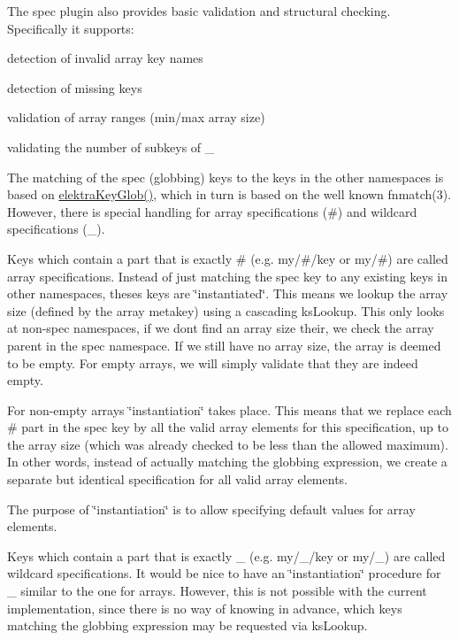 The spec plugin also provides basic validation and structural checking. Specifically it supports\+:


\begin{DoxyItemize}
\item detection of invalid array key names
\item detection of missing keys
\item validation of array ranges (min/max array size)
\item validating the number of subkeys of {\ttfamily \+\_\+}
\end{DoxyItemize}

The matching of the spec (globbing) keys to the keys in the other namespaces is based on {\ttfamily \mbox{\hyperlink{globbing_8c_ad7700821df72fc0fc3bfc336e4368d29}{elektra\+Key\+Glob()}}}, which in turn is based on the well known {\ttfamily fnmatch(3)}. However, there is special handling for array specifications ({\ttfamily \#}) and wildcard specifications ({\ttfamily \+\_\+}).

Keys which contain a part that is exactly {\ttfamily \#} (e.\+g. {\ttfamily my/\#/key} or {\ttfamily my/\#}) are called array specifications. Instead of just matching the spec key to any existing keys in other namespaces, theses keys are \char`\"{}instantiated\char`\"{}. This means we lookup the array size (defined by the {\ttfamily array} metakey) using a cascading {\ttfamily ks\+Lookup}. This only looks at non-\/spec namespaces, if we don\textquotesingle{}t find an array size their, we check the array parent in the spec namespace. If we still have no array size, the array is deemed to be empty. For empty arrays, we will simply validate that they are indeed empty.

For non-\/empty arrays \char`\"{}instantiation\char`\"{} takes place. This means that we replace each {\ttfamily \#} part in the spec key by all the valid array elements for this specification, up to the array size (which was already checked to be less than the allowed maximum). In other words, instead of actually matching the globbing expression, we create a separate but identical specification for all valid array elements.

The purpose of \char`\"{}instantiation\char`\"{} is to allow specifying {\ttfamily default} values for array elements.

Keys which contain a part that is exactly {\ttfamily \+\_\+} (e.\+g. {\ttfamily my/\+\_\+/key} or {\ttfamily my/\+\_\+}) are called wildcard specifications. It would be nice to have an \char`\"{}instantiation\char`\"{} procedure for {\ttfamily \+\_\+} similar to the one for arrays. However, this is not possible with the current implementation, since there is no way of knowing in advance, which keys matching the globbing expression may be requested via {\ttfamily ks\+Lookup}.

